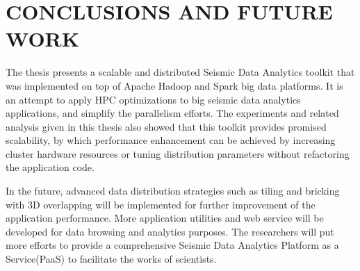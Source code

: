 %
%
%



\chapter{\uppercase{Conclusions and Future Work}}

The thesis presents a scalable and distributed Seismic Data Analytics toolkit that was implemented on top of Apache Hadoop and Spark big data platforms. It is an attempt to apply HPC optimizations to big seismic data analytics applications, and simplify the parallelism efforts. The experiments and related analysis given in this thesis also showed that this toolkit provides promised scalability, by which performance enhancement can be achieved by increasing cluster hardware resources or tuning distribution parameters without refactoring the application code.

In the future, advanced data distribution strategies such as tiling and bricking with 3D overlapping will be implemented for further improvement of the application performance. More application utilities and web service will be developed for data browsing and analytics purposes. The researchers will put more efforts to provide a comprehensive Seismic Data Analytics Platform as a Service(PaaS) to facilitate the works of scientists. 




